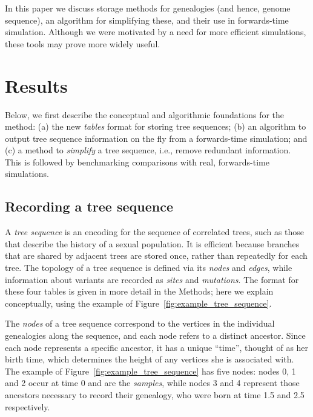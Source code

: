 \documentclass{article}
\begin{document}
In this paper we discuss storage methods for genealogies (and hence, genome sequence),
an algorithm for simplifying these,
and their use in forwards-time simulation.
Although we were motivated by a need for more efficient simulations,
these tools may prove more widely useful.


\section*{Results}


Below, we first describe the conceptual and algorithmic foundations for the method:
(a) the new \emph{tables} format for storing tree sequences;
(b) an algorithm to output tree sequence information on the fly
    from a forwards-time simulation;
and (c) a method to \emph{simplify} a tree sequence, i.e., remove redundant information.
This is followed by benchmarking comparisons
with real, forwards-time simulations.


\subsection*{Recording a tree sequence}

A \emph{tree sequence} is an encoding for the sequence of correlated trees,
such as those that describe the history of a sexual population.
It is efficient because branches that are shared by adjacent trees are stored once, 
rather than repeatedly for each tree.
The topology of a tree sequence is defined via its \emph{nodes} and \emph{edges},
while information about variants are recorded as \emph{sites} and \emph{mutations}.
The format for these four tables is given in more detail in the Methods;
here we explain conceptually,
using the example of Figure~\ref{fig:example_tree_sequence}.

The \emph{nodes} of a tree sequence 
correspond to the vertices in the individual genealogies along the sequence,
and each node refers to a distinct ancestor.
Since each node represents a specific ancestor, it has a unique ``time'',
thought of as her birth time, which determines the height of any vertices
she is associated with. 
The example of Figure~\ref{fig:example_tree_sequence} has five nodes:
nodes 0, 1 and 2 occur at time 0 and are the \emph{samples},
while nodes 3 and 4 represent those ancestors necessary to record their genealogy,
who were born at time 1.5 and 2.5 respectively.
\end{document}
